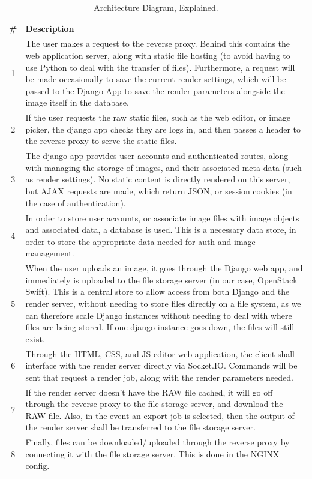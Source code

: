 \documentclass[12pt,a4paper]{article}
\begin{document}
\begin{table}
  \centering
  \begin{tabular}{| c | p{13cm} | }
    \hline
    \textbf{\#} & \textbf{Description} \\
    \hline
    1 & The user makes a request to the reverse proxy. Behind this contains the
        web application server, along with static file hosting (to avoid having to use Python to
        deal with the transfer of files). Furthermore, a request will be made occasionally to save the current render
        settings, which will be passed to the Django App to save the render parameters alongside the image itself in the database.\\
    \hline
    2 & If the user requests the raw static files, such as the web editor, or image picker, the django app checks they
        are logs in, and then passes a header to the reverse proxy to serve the static files.\\
    \hline
    3 & The django app provides user accounts and authenticated routes, along with managing the storage of images, and their associated
        meta-data (such as render settings). No static content is directly rendered on this server, but AJAX requests are made, which return JSON,
        or session cookies (in the case of authentication).\\
    \hline
    4 & In order to store user accounts, or associate image files with image objects and associated data, a database is used. This is a necessary data store,
        in order to store the appropriate data needed for auth and image management.\\
    \hline
    5 & When the user uploads an image, it goes through the Django web app, and immediately is uploaded to the file storage server (in our case, OpenStack Swift).
        This is a central store to allow access from both Django and the render server, without needing to store files directly on a file system, as we can therefore
        scale Django instances without needing to deal with where files are being stored. If one django instance goes down, the files will still exist.\\
    \hline
    6 & Through the HTML, CSS, and JS editor web application, the client shall interface with the render server directly via Socket.IO. Commands will be sent that
        request a render job, along with the render parameters needed.\\
    \hline
    7 & If the render server doesn't have the RAW file cached, it will go off through the reverse proxy to the file storage server, and download the RAW file. Also,
        in the event an export job is selected, then the output of the render server shall be transferred to the file storage server.\\
    \hline
    8 & Finally, files can be downloaded/uploaded through the reverse proxy by connecting it with the file storage server. This is done in the NGINX config. \\
    \hline
  \end{tabular}
  \caption{Architecture Diagram, Explained.}
  \label{ArchitectureDiagramTable}
\end{table}
\end{document}
